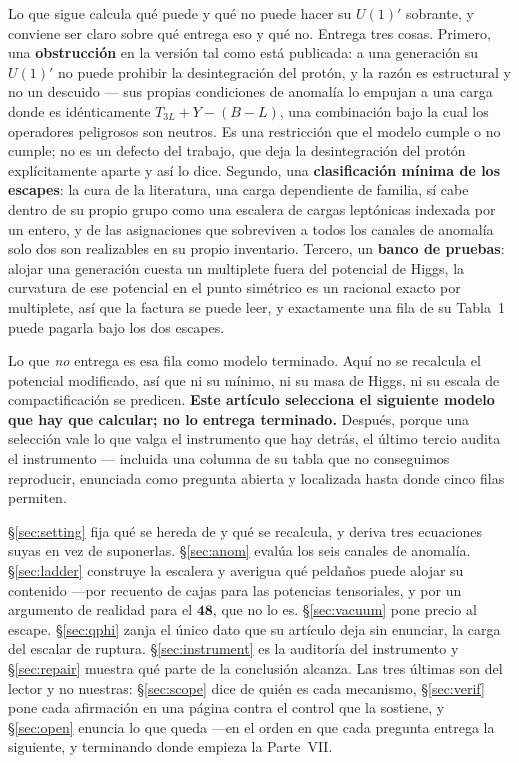 \documentclass[11pt,a4paper]{article}
\newcommand{\rep}[1]{\mathbf{#1}}
\begin{document}
Lo que sigue calcula qué puede y qué no puede hacer su $U(1)'$ sobrante, y conviene ser claro sobre
qué entrega eso y qué no. Entrega tres cosas. Primero, una \textbf{obstrucción} en la versión tal como
está publicada: a una generación su $U(1)'$ no puede prohibir la desintegración del protón, y la razón
es estructural y no un descuido --- sus propias condiciones de anomalía lo empujan a una carga donde
es idénticamente $T_{3L}+Y-(B-L)$, una combinación bajo la cual los operadores peligrosos son neutros.
Es una restricción que el modelo cumple o no cumple; no es un defecto del trabajo, que deja la
desintegración del protón explícitamente aparte y así lo dice. Segundo, una \textbf{clasificación
mínima de los escapes}: la cura de la literatura, una carga dependiente de familia, sí cabe dentro de
su propio grupo como una escalera de cargas leptónicas indexada por un entero, y de las asignaciones
que sobreviven a todos los canales de anomalía solo dos son realizables en su propio inventario.
Tercero, un \textbf{banco de pruebas}: alojar una generación cuesta un multiplete fuera del potencial
de Higgs, la curvatura de ese potencial en el punto simétrico es un racional exacto por multiplete,
así que la factura se puede leer, y exactamente una fila de su Tabla~1 puede pagarla bajo los dos
escapes.

Lo que \emph{no} entrega es esa fila como modelo terminado. Aquí no se recalcula el potencial
modificado, así que ni su mínimo, ni su masa de Higgs, ni su escala de compactificación se predicen.
\textbf{Este artículo selecciona el siguiente modelo que hay que calcular; no lo entrega terminado.}
Después, porque una selección vale lo que valga el instrumento que hay detrás, el último tercio audita
el instrumento --- incluida una columna de su tabla que no conseguimos reproducir, enunciada como
pregunta abierta y localizada hasta donde cinco filas permiten.

\S\ref{sec:setting} fija qué se hereda de \cite{KM25} y qué se recalcula, y deriva tres ecuaciones
suyas en vez de suponerlas. \S\ref{sec:anom} evalúa los seis canales de anomalía. \S\ref{sec:ladder}
construye la escalera y averigua qué peldaños puede alojar su contenido ---por recuento de cajas para
las potencias tensoriales, y por un argumento de realidad para el $\rep{48}$, que no lo
es. \S\ref{sec:vacuum} pone
precio al escape. \S\ref{sec:qphi} zanja el único dato que su artículo deja sin enunciar, la carga del
escalar de ruptura. \S\ref{sec:instrument} es la auditoría del instrumento y \S\ref{sec:repair}
muestra qué parte de la conclusión alcanza. Las tres últimas son del lector y no nuestras:
\S\ref{sec:scope} dice de quién es cada mecanismo, \S\ref{sec:verif} pone cada afirmación en una
página contra el control que la sostiene, y \S\ref{sec:open} enuncia lo que queda ---en el orden en
que cada pregunta entrega la siguiente, y terminando donde empieza la Parte~VII.
\end{document}
